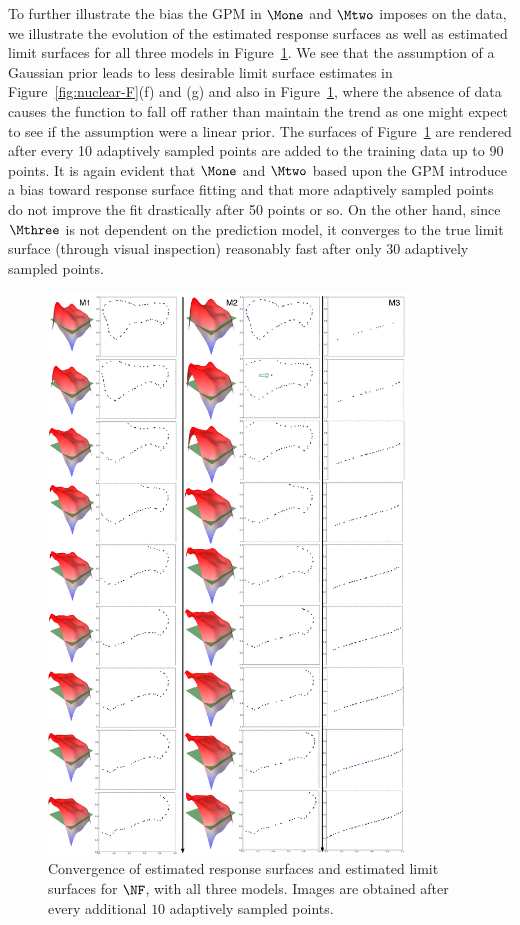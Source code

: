 To further illustrate the bias the GPM in $\Mone$ and $\Mtwo$ imposes on the data, we illustrate the evolution of the estimated response surfaces as well as estimated limit surfaces for all three models in Figure~\ref{fig:nuclear-F-surface-converge}.
%
We see that the assumption of a Gaussian prior leads to less desirable limit surface estimates in Figure~\ref{fig:nuclear-F}(f) and (g) and also in Figure~\ref{fig:nuclear-F-surface-converge}, where the absence of data causes the function to fall off rather than maintain the trend as one might expect to see if the assumption were a linear prior.
%
The surfaces of Figure~\ref{fig:nuclear-F-surface-converge} are rendered after every 10 adaptively sampled points are added to the training data up to 90 points.
%
It is again evident that $\Mone$ and $\Mtwo$ based upon the GPM introduce a bias toward response surface fitting and that more adaptively sampled points do not improve the fit drastically after 50 points or so.
%
On the other hand, since $\Mthree$ is not dependent on the prediction model, it converges to the true limit surface (through visual inspection) reasonably fast after only 30 adaptively sampled points.

\begin{figure}%
  \centering
  \includegraphics[width=0.85\textwidth]{figs/chap5/nuclear-F-surface-converge.pdf}
  \caption{Convergence of estimated response surfaces and estimated limit surfaces for $\protect\NF$,  with all three models. Images are obtained after every additional $10$ adaptively sampled points.}
  \label{fig:nuclear-F-surface-converge}
\end{figure}

